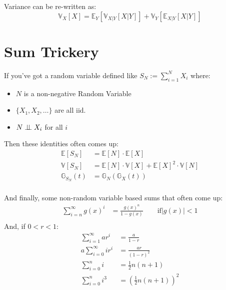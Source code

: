 Variance can be re-written as:
\begin{equation*}
    \mathbb{V}_X[X] = \mathbb{E}_Y[ \mathbb{V}_{X|Y}[X|Y] ] + \mathbb{V}_Y[
    \mathbb{E}_{X|Y}[X|Y] ] 
\end{equation*}


\section{Sum Trickery}
If you've got a random variable defined like $S_N := \sum_{i=1}^{N} X_i$ where:
\begin{itemize}
    \item $N$ is a non-negative Random Variable
    \item $\{X_1, X_2, \dots\}$ are all iid.
    \item $N \perp \!\!\! \perp X_i$ for all $i$
\end{itemize}
Then these identities often comes up:
\begin{equation*}
    \begin{aligned}
        \mathbb{E}[S_N] &= \mathbb{E}[N] \cdot \mathbb{E}[X] \\
        \mathbb{V}[S_N] &= \mathbb{E}[N] \cdot \mathbb{V}[X] + \mathbb{E}[X]^2
        \cdot \mathbb{V}[N] \\
        \mathbb{G}_{S_N}(t) &= \mathbb{G}_{N}(\mathbb{G}_{X}(t)) \\
    \end{aligned}
\end{equation*}

And finally, some non-random variable based sums that often come up:
\begin{equation*}
    \begin{aligned}
        \sum_{i=n}^{\infty} g(x)^i &= \frac{g(x)^n}{1 - g(x)} \qquad \text{if}
        |g(x)| < 1 \\
    \end{aligned}
\end{equation*}
And, if $0 < r < 1$:
\begin{equation*}
    \begin{aligned}
        \sum_{i=1}^\infty a r^i &= \frac{a}{1 - r} \\
        a \sum_{i=0}^{\infty} ir^i &= \frac{ar}{(1-r)^2}\\
        \sum_{i=0}^n i &= \frac{1}{2} n(n+1)\\
        \sum_{i=0}^{n} i^3 &= \left(  \frac{1}{2} n (n+1)\right)^2 \\
    \end{aligned}
\end{equation*}


